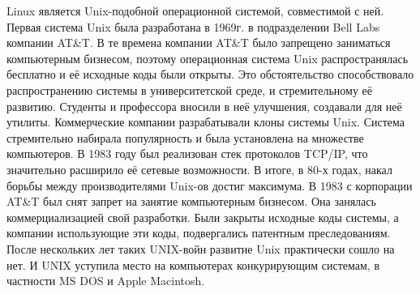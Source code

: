 \documentclass[bachelor, och, referat, times]{SCWorks}
\begin{document}
\par Linux является Unix-подобной операционной системой, совместимой с 
ней. Первая система Unix была разработана в 1969г. в подразделении Bell 
Labs компании AT\&T. В те времена компании AT\&T было запрещено заниматься
компьютерным бизнесом, поэтому операционная система Unix распространялась 
бесплатно и её исходные коды были открыты. Это обстоятельство 
способствовало распространению системы в университетской среде, и 
стремительному её развитию. Студенты и профессора вносили в неё улучшения,
создавали для неё утилиты. Коммерческие компании разрабатывали клоны 
системы Unix. Система стремительно набирала популярность и была 
установлена на множестве компьютеров. В 1983 году был реализован стек 
протоколов TCP/IP, что значительно расширило её сетевые возможности. В 
итоге, в 80-х годах, накал борьбы между производителями Unix-ов достиг 
максимума. В 1983 с корпорации AT\&T был снят запрет на занятие 
компьютерным бизнесом. Она занялась коммерциализацией свой разработки. 
Были закрыты исходные коды системы, а компании использующие эти коды, 
подвергались патентным преследованиям. После нескольких лет таких 
UNIX-войн развитие Unix практически сошло на нет. И UNIX уступила место на
компьютерах конкурирующим системам, в частности MS DOS и Apple Macintosh.
\end{document}
